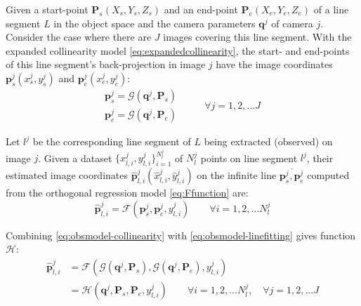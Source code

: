Given a start-point $\mathbf{P}_s(X_s,Y_s,Z_s)$ and an end-point $\mathbf{P}_e(X_e,Y_e,Z_e)$ of a line segment $L$ in the object space and the camera parameters $\mathbf{q}^j$ of camera $j$. Consider the case where there are $J$ images covering this line segment. With the expanded collinearity model \eqref{eq:expandedcollinearity}, the start- and end-points of this line segment's back-projection in image $j$ have the image coordinates $\mathbf{p}^j_s(x^j_s,y^j_s)$ and $\mathbf{p}^j_e(x^j_e,y^j_e)$:
\begin{equation} \label{eq:obsmodel-collinearity}
\begin{split}
\mathbf{p}^j_s = \mathcal{G}(\mathbf{q}^j,\mathbf{P}_s)\\
\mathbf{p}^j_e = \mathcal{G}(\mathbf{q}^j,\mathbf{P}_e)
\end{split}
\qquad
\begin{split}
\forall j=1,2,...J
\end{split}
\end{equation}

Let $l^j$ be the corresponding line segment of $L$ being extracted (observed) on image $j$. Given a dataset $\{x^j_{l,i},y^j_{l,i}\}^{N^j_l}_{i=1}$ of $N^j_l$ points on line segment $l^j$, their estimated image coordinates $\hat{\mathbf{p}}^j_{l,i}(\hat{x}^j_{l,i},\hat{y}^j_{l,i})$ on the infinite line $\overline{\mathbf{p}^j_s,\mathbf{p}^j_e}$ computed from the orthogonal regression model \eqref{eq:Ffunction} are:
\begin{equation} \label{eq:obsmodel-linefitting}
\hat{\mathbf{p}}^j_{l,i} = \mathcal{F}(\mathbf{p}^j_s,\mathbf{p}^j_e,y^j_{l,i})
\qquad
\forall i=1,2,...N^j_l
\end{equation}


Combining \eqref{eq:obsmodel-collinearity} with \eqref{eq:obsmodel-linefitting} gives function $\mathcal{H}$:
\begin{equation} \label{eq:obsmodel}
\begin{split}
\hat{\mathbf{p}}^j_{l,i} &= \mathcal{F}(\mathcal{G}(\mathbf{q}^j,\mathbf{P}_s),\mathcal{G}(\mathbf{q}^j,\mathbf{P}_e),y^j_{l,i})\\
&=\mathcal{H}(\mathbf{q}^j,\mathbf{P}_s,\mathbf{P}_e,y^j_{l,i})
\qquad
\forall i=1,2,...N^j_l,\quad\forall j=1,2,...J
\end{split}
\end{equation}

